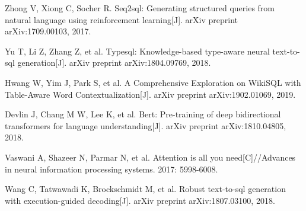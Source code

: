 \documentclass{llncs}
\begin{document}
\begin{thebibliography}{8}

Zhong V, Xiong C, Socher R. Seq2sql: Generating structured queries from natural language using reinforcement learning[J]. arXiv preprint arXiv:1709.00103, 2017.

Yu T, Li Z, Zhang Z, et al. Typesql: Knowledge-based type-aware neural text-to-sql generation[J]. arXiv preprint arXiv:1804.09769, 2018.

Hwang W, Yim J, Park S, et al. A Comprehensive Exploration on WikiSQL with Table-Aware Word Contextualization[J]. arXiv preprint arXiv:1902.01069, 2019.

Devlin J, Chang M W, Lee K, et al. Bert: Pre-training of deep bidirectional transformers for language understanding[J]. arXiv preprint arXiv:1810.04805, 2018.

Vaswani A, Shazeer N, Parmar N, et al. Attention is all you need[C]//Advances in neural information processing systems. 2017: 5998-6008.

Wang C, Tatwawadi K, Brockschmidt M, et al. Robust text-to-sql generation with execution-guided decoding[J]. arXiv preprint arXiv:1807.03100, 2018.

\end{thebibliography}
\end{document}

